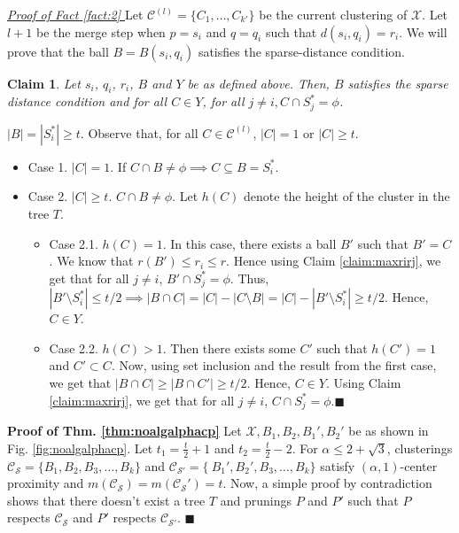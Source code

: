\documentclass[orivec]{llncs}
\newtheorem{smallLemma}{Claim}
\newcommand{\mc}{\mathcal}
\renewcommand{\qed}{\hfill\ensuremath{\blacksquare}}
\begin{document}
\noindent\textit{\underline{Proof of Fact \ref{fact:2}
}}
Let $\mc C^{(l)} = \{C_1, \ldots, C_{k'}\}$ be the current clustering of $\mc X$. Let $l+1$ be the merge step when $p = s_i$ and $q = q_i$ such that $d(s_i, q_i) = r_i$. We will prove that the ball $B = B(s_i, q_i)$ satisfies the sparse-distance condition.

\begin{smallLemma}
\label{claim:dciqi}
Let $s_i$, $q_i$, $r_i$, $B$ and $Y$ be as defined above. Then, $B$ satisfies the sparse distance condition and for all $C \in Y$, for all $j \neq i, C \cap S_j^* = \phi$.
\end{smallLemma}
\vspace{-0.1in} $|B| = |S_i^*| \ge t$. Observe that, for all $C \in \mc C^{(l)}$, $|C| = 1$ or $|C| \ge t$. 

\begin{itemize}[nolistsep,leftmargin=*]
\item Case 1. $|C| = 1$. If $C \cap B \neq \phi \implies C \subseteq B = S_i^*$.
\item Case 2. $|C|\ge t$. $C \cap B \neq \phi$. Let $h(C)$ denote the height of the cluster in the tree $T$. 
\begin{itemize}[leftmargin=*]
\renewcommand\labelitemii{$\circ$}
\item Case 2.1. $h(C) = 1$. In this case, there exists a ball $B'$ such that $B' = C$. We know that $r(B') \le r_i \le r$. Hence using Claim \ref{claim:maxrirj}, we get that for all $j \neq i$, $B' \cap S_j^* = \phi$. Thus, $|B'\setminus S_i^*| \le t/2 \implies |B\cap C| = |C| - |C\setminus B| = |C| - |B'\setminus S_i^*| \ge t/2$. Hence, $C \in Y$.

\item Case 2.2. $h(C) > 1$. Then there exists some $C'$ such that $h(C') = 1$ and $C' \subset C$. Now, using set inclusion and the result from the first case, we get that $|B\cap C| \ge |B\cap C'| \ge t/2$. Hence, $C \in Y$. Using Claim \ref{claim:maxrirj}, we get that for all $j \neq i$, $C \cap S_j^* = \phi$.\qed\\
\end{itemize} 
\end{itemize}


\noindent\textbf{Proof of Thm. \ref{thm:noalgalphacp}}
Let $\mc X, B_1, B_2, B_1', B_2'$ be as shown in Fig. \ref{fig:noalgalphacp}. Let $t_1 = \frac{t}{2}+1$ and $t_2 = \frac{t}{2}-2$. For $\alpha \le 2+\sqrt{3}$, clusterings $\mc C_{\mc S} = \{B_1, B_2, B_3, \ldots, B_k\}$ and $\mc C_{\mc S'} = \{\ B_1', B_2', B_3, \ldots, B_k\}$ satisfy $(\alpha, 1)$-center proximity and $m(\mc C_{\mc S}) = m(\mc C_{\mc S}') = t$. Now, a simple proof by contradiction shows that there doesn't exist a tree $T$ and prunings $P$ and $P'$ such that $P$ respects $\mc C_{\mc S}$ and $P'$ respects $\mc C_{\mc S'}$. \qed\\
\end{document}
